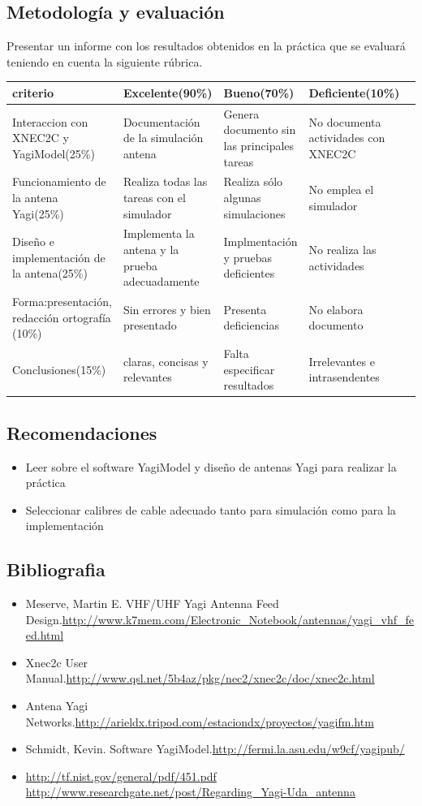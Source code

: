 \documentclass[onecolumn]{article}
\newcommand{\marco}[2]
{
{\fboxsep 10pt
    \begin{framed}

\section{#1}
#2
\end{framed}
}
}
\newcommand{\metodologia}[1] { \marco{Metodología y evaluación}{#1} }
\newcommand{\recomendaciones}[1] { \marco{Recomendaciones}{#1} }
\newcommand{\bibliografia}[1] { \marco{Bibliografia}{#1} }
\begin{document}
\metodologia{

Presentar un informe con los resultados obtenidos en la práctica que se
evaluará  teniendo en cuenta la siguiente rúbrica.

\newcommand{\med}{0.22}
\begin{tabular}{|p{\med\textwidth}|p{\med\textwidth}|p{\med\textwidth}|p{\med\textwidth}|p{\med\textwidth}|}
\hline
criterio&Excelente(90\%)&Bueno(70\%)&Deficiente(10\%)\\
\hline
Interaccion con XNEC2C y YagiModel(25\%)&Documentación de la simulación antena&Genera documento sin las principales tareas&No documenta actividades con XNEC2C\\
\hline
Funcionamiento de la antena Yagi(25\%)&Realiza todas las tareas con el simulador&Realiza sólo algunas simulaciones&No emplea el simulador\\
\hline
Diseño e implementación de la antena(25\%)&Implementa la antena y la prueba adecuadamente&Implmentación y pruebas deficientes&No realiza las actividades\\
\hline
Forma:presentación, redacción ortografía (10\%)&Sin errores y bien
presentado&Presenta deficiencias&No elabora documento\\
\hline
Conclusiones(15\%)&claras, concisas y relevantes&Falta especificar resultados&Irrelevantes e intrasendentes\\
\hline
\end{tabular}
}
\recomendaciones{

\begin{itemize}
\item Leer sobre el software YagiModel y diseño de antenas Yagi para realizar la práctica
\item Seleccionar calibres de cable adecuado tanto para simulación como para la implementación

\end{itemize}
}

\bibliografia{

\begin{itemize}\itemsep=-4pt
  \item Meserve, Martin E. VHF/UHF Yagi Antenna Feed Design.\url{http://www.k7mem.com/Electronic_Notebook/antennas/yagi_vhf_feed.html}
  \item Xnec2c User Manual.\url{http://www.qsl.net/5b4az/pkg/nec2/xnec2c/doc/xnec2c.html }
  \item Antena Yagi
Networks.\url{http://arieldx.tripod.com/estaciondx/proyectos/yagifm.htm}
\item Schmidt, Kevin. Software YagiModel.\url {http://fermi.la.asu.edu/w9cf/yagipub/}
\item \url{http://tf.nist.gov/general/pdf/451.pdf} \url{http://www.researchgate.net/post/Regarding_Yagi-Uda_antenna}
 
\end{itemize}
}
\end{document}

